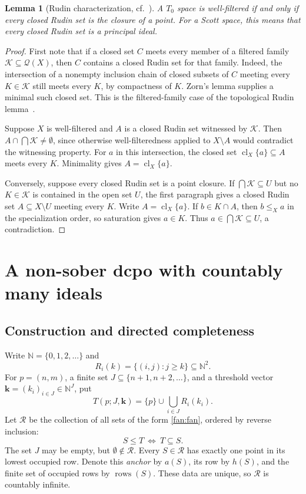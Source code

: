 \documentclass[10pt,a4paper]{article}
\newtheorem{lemma}[theorem]{Lemma}
\theoremstyle{definition}
\newcommand{\N}{\mathbb N}
\newcommand{\RR}{\mathcal R}
\newcommand{\rows}{\operatorname{rows}}
\begin{document}
\begin{lemma}[Rudin characterization, cf.~\cite{XZ}]\label{wf:rudin-characterization}
A $T_0$ space is well-filtered if and only if every closed Rudin set is the closure of a point. For a Scott space, this means that every closed Rudin set is a principal ideal.
\end{lemma}
\begin{proof}
First note that if a closed set $C$ meets every member of a filtered family $\mathcal K\subseteq\mathcal Q(X)$, then $C$ contains a closed Rudin set for that family. Indeed, the intersection of a nonempty inclusion chain of closed subsets of $C$ meeting every $K\in\mathcal K$ still meets every $K$, by compactness of $K$. Zorn's lemma supplies a minimal such closed set. This is the filtered-family case of the topological Rudin lemma~\cite{XZ}.

Suppose $X$ is well-filtered and $A$ is a closed Rudin set witnessed by $\mathcal K$. Then $A\cap\bigcap\mathcal K\ne\emptyset$, since otherwise well-filteredness applied to $X\setminus A$ would contradict the witnessing property. For $a$ in this intersection, the closed set $\operatorname{cl}_X\{a\}\subseteq A$ meets every $K$. Minimality gives $A=\operatorname{cl}_X\{a\}$.

Conversely, suppose every closed Rudin set is a point closure. If $\bigcap\mathcal K\subseteq U$ but no $K\in\mathcal K$ is contained in the open set $U$, the first paragraph gives a closed Rudin set $A\subseteq X\setminus U$ meeting every $K$. Write $A=\operatorname{cl}_X\{a\}$. If $b\in K\cap A$, then $b\leq_X a$ in the specialization order, so saturation gives $a\in K$. Thus $a\in\bigcap\mathcal K\subseteq U$, a contradiction.
\end{proof}

\section{A non-sober dcpo with countably many ideals}\label{sec:fan}
\subsection{Construction and directed completeness}
Write $\N=\{0,1,2,\ldots\}$ and
\[
 R_i(k)=\{(i,j):j\geq k\}\subseteq\N^2.
\]
For $p=(n,m)$, a finite set $J\subseteq\{n+1,n+2,\ldots\}$, and a threshold vector $\mathbf k=(k_i)_{i\in J}\in\N^J$, put
\begin{equation}\label{fan:fan}
 T(p;J,\mathbf k)=\{p\}\cup\bigcup_{i\in J}R_i(k_i).
\end{equation}
Let $\RR$ be the collection of all sets of the form \eqref{fan:fan}, ordered by reverse inclusion:
\[
 S\leq T~\Longleftrightarrow~ T\subseteq S.
\]
The set $J$ may be empty, but $\emptyset\notin\RR$. Every $S\in\RR$ has exactly one point in its lowest occupied row. Denote this \emph{anchor} by $a(S)$, its row by $h(S)$, and the finite set of occupied rows by $\rows(S)$. These data are unique, so $\RR$ is countably infinite.
\end{document}
